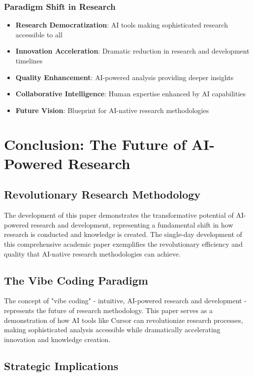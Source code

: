 \documentclass[12pt,a4paper]{book}
\begin{document}
\subsubsection{Paradigm Shift in Research}

\begin{itemize}
    \item \textbf{Research Democratization}: AI tools making sophisticated research accessible to all
    \item \textbf{Innovation Acceleration}: Dramatic reduction in research and development timelines
    \item \textbf{Quality Enhancement}: AI-powered analysis providing deeper insights
    \item \textbf{Collaborative Intelligence}: Human expertise enhanced by AI capabilities
    \item \textbf{Future Vision}: Blueprint for AI-native research methodologies
\end{itemize}

\section{Conclusion: The Future of AI-Powered Research}

\subsection{Revolutionary Research Methodology}

The development of this paper demonstrates the transformative potential of AI-powered research and development, representing a fundamental shift in how research is conducted and knowledge is created. The single-day development of this comprehensive academic paper exemplifies the revolutionary efficiency and quality that AI-native research methodologies can achieve.

\subsection{The Vibe Coding Paradigm}

The concept of "vibe coding" - intuitive, AI-powered research and development - represents the future of research methodology. This paper serves as a demonstration of how AI tools like Cursor can revolutionize research processes, making sophisticated analysis accessible while dramatically accelerating innovation and knowledge creation.

\subsection{Strategic Implications}
\end{document}
